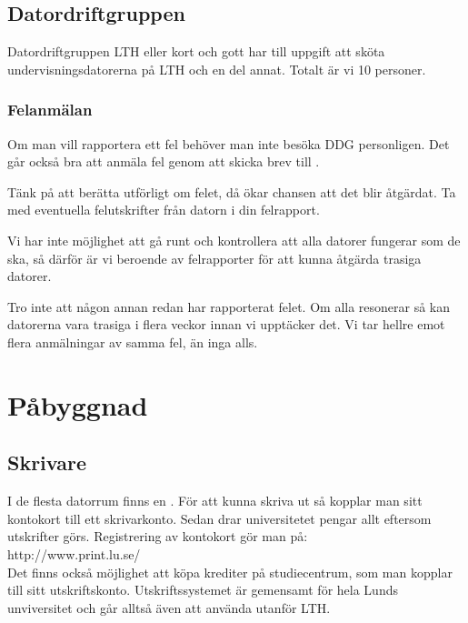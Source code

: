 \documentclass[a4paper,twocolumn]{book}
\begin{document}
\section{Datordriftgruppen}

Datordriftgruppen LTH eller kort och gott
 har till uppgift att sköta undervisningsdatorerna på
LTH och en del annat. Totalt är vi 10 personer. 

\subsection{Felanmälan}
Om man vill rapportera ett fel behöver man inte besöka DDG
personligen. Det går också bra att anmäla fel genom att skicka brev till
. 

Tänk på att berätta utförligt om felet, då ökar chansen att det blir
åtgärdat. Ta med eventuella felutskrifter från datorn i din
felrapport.

Vi har inte möjlighet att gå runt och kontrollera att alla datorer
fungerar som de ska, så därför är vi beroende av felrapporter för att
kunna åtgärda trasiga datorer.

Tro inte att någon annan redan har rapporterat felet. Om alla
resonerar så kan datorerna vara trasiga i flera veckor innan vi
upptäcker det. Vi tar hellre emot flera anmälningar av samma fel, än
inga alls.


\chapter{Påbyggnad}
\label{cha:pabyggnad}

\section{Skrivare}

\label{sec:skrivare}
I de flesta datorrum finns en .
För att kunna skriva ut så kopplar man sitt kontokort till ett skrivarkonto. 
Sedan drar universitetet pengar allt eftersom utskrifter görs. Registrering av kontokort gör man på: \\
http://www.print.lu.se/ \\
Det finns också möjlighet att köpa krediter på studiecentrum, som man kopplar till sitt utskriftskonto.
Utskriftssystemet är gemensamt för hela Lunds 
unviversitet och går alltså även att använda utanför LTH.
\end{document}
